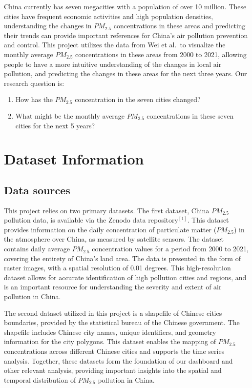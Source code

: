 \documentclass[
  12pt,
]{article}
\providecommand{\tightlist}{%
  \setlength{\itemsep}{0pt}\setlength{\parskip}{0pt}}
\begin{document}
China currently has seven megacities with a population of over 10
million. These cities have frequent economic activities and high
population densities, understanding the changes in \(PM_{2.5}\)
concentrations in these areas and predicting their trends can provide
important references for China's air pollution prevention and control.
This project utilizes the data from Wei et al.~to visualize the monthly
average \(PM_{2.5}\) concentrations in these areas from 2000 to 2021,
allowing people to have a more intuitive understanding of the changes in
local air pollution, and predicting the changes in these areas for the
next three years. Our research question is:

\begin{enumerate}
\def\labelenumi{\arabic{enumi}.}
\tightlist
\item
  How has the \(PM_{2.5}\) concentration in the seven cities changed?
\item
  What might be the monthly average \(PM_{2.5}\) concentrations in these
  seven cities for the next 5 years?
\end{enumerate}

\newpage

\hypertarget{dataset-information}{%
\section{Dataset Information}\label{dataset-information}}

\hypertarget{data-sources}{%
\subsection{Data sources}\label{data-sources}}

This project relies on two primary datasets. The first dataset, China
\(PM_{2.5}\) pollution data, is available via the Zenodo data
repository\(^{[1]}\). This dataset provides information on the daily
concentration of particulate matter (\(PM_{2.5}\)) in the atmosphere
over China, as measured by satellite sensors. The dataset contains daily
average \(PM_{2.5}\) concentration values for a period from 2000 to
2021, covering the entirety of China's land area. The data is presented
in the form of raster images, with a spatial resolution of 0.01 degrees.
This high-resolution dataset allows for accurate identification of high
pollution cities and regions, and is an important resource for
understanding the severity and extent of air pollution in China.

The second dataset utilized in this project is a shapefile of Chinese
cities boundaries, provided by the statistical bureau of the Chinese
government. The shapefile includes Chinese city names, unique
identifiers, and geometry information for the city polygons. This
dataset enables the mapping of \(PM_{2.5}\) concentrations across
different Chinese cities and supports the time series analysis.
Together, these datasets form the foundation of our dashboard and other
relevant analysis, providing important insights into the spatial and
temporal distribution of \(PM_{2.5}\) pollution in China.
\end{document}
